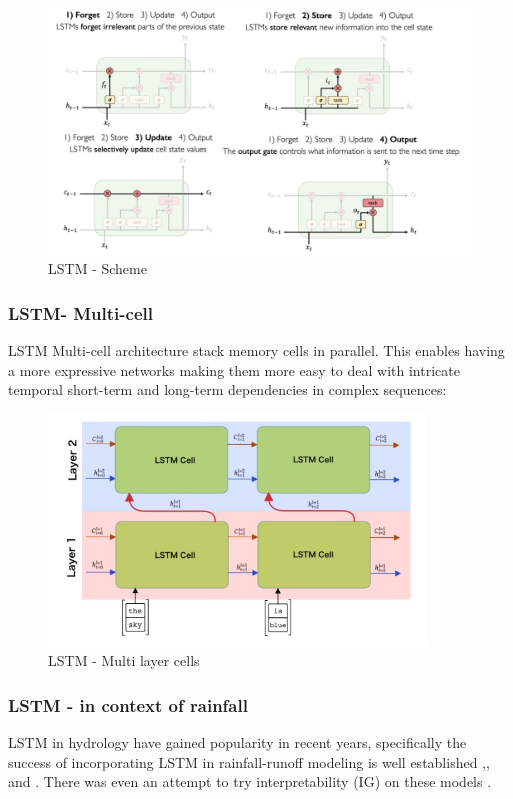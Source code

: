 \documentclass[12pt]{report}
\begin{document}
\begin{figure}[H]\centering\includegraphics[width=14cm]{LSTM_SCHEME.jpeg}\caption{LSTM - Scheme}\end{figure}




\subsubsection{LSTM- Multi-cell}

LSTM Multi-cell architecture stack memory cells in parallel. This enables  having a more expressive networks making them more easy to deal with intricate temporal short-term and long-term dependencies in complex sequences:
\begin{figure}[H]\centering\includegraphics[width=10cm]{LSTM_MULTI.png}\caption{LSTM - Multi layer cells}\end{figure}

\subsubsection{LSTM - in context of rainfall}

LSTM in hydrology have gained popularity in recent years, specifically the success of incorporating LSTM in rainfall-runoff modeling is well established \cite{kratzert2018rainfall},\cite{kratzert2019toward1},\cite{kratzert2019towards2} and \cite{gauch2021rainfall}. There was even an attempt to try interpretability (IG) on these models \cite{Kratzert_2019IG}.\\
\end{document}
